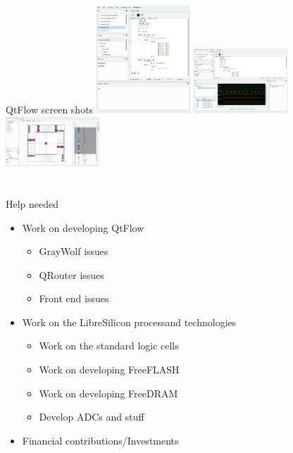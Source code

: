\documentclass[9pt]{beamer}
\begin{document}
\begin{frame}{QtFlow screen shots}
	\includegraphics[width=100pt]{Screenshot_20171218_044022.png}
	\includegraphics[width=100pt]{Screenshot_20171218_045118.png}
	\includegraphics[width=100pt]{Screenshot_20171218_045416.png}
\end{frame}

\section[Conclusion]{}

\begin{frame}{Help needed}
	\begin{itemize}
		\item Work on developing QtFlow
		\begin{itemize}
			\item GrayWolf issues\footnotemark
			\item QRouter issues\footnotemark
			\item Front end issues\footnotemark
		\end{itemize}
		\item Work on the LibreSilicon process\footnotemark and technologies\footnotemark
		\begin{itemize}
			\item Work on the standard logic cells
			\item Work on developing FreeFLASH
			\item Work on developing FreeDRAM
			\item Develop ADCs and stuff
		\end{itemize}
		\item Financial contributions/Investments
	\end{itemize}

\end{frame}
\end{document}
